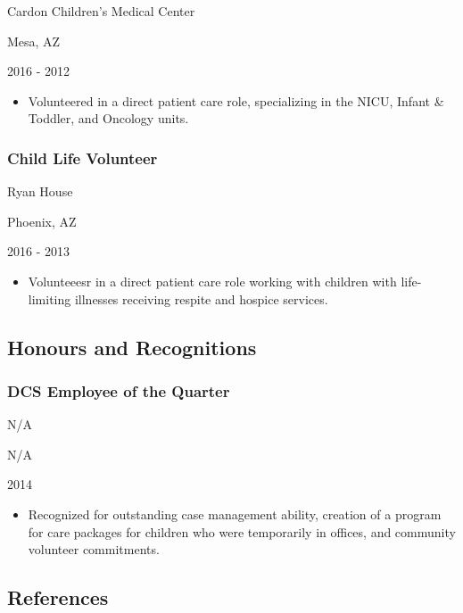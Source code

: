 \documentclass[
]{article}
\providecommand{\tightlist}{%
  \setlength{\itemsep}{0pt}\setlength{\parskip}{0pt}}
\begin{document}
Cardon Children's Medical Center

Mesa, AZ

2016 - 2012

\begin{itemize}
\tightlist
\item
  Volunteered in a direct patient care role, specializing in the NICU,
  Infant \& Toddler, and Oncology units.
\end{itemize}

\hypertarget{child-life-volunteer}{%
\subsubsection{Child Life Volunteer}\label{child-life-volunteer}}

Ryan House

Phoenix, AZ

2016 - 2013

\begin{itemize}
\tightlist
\item
  Volunteeesr in a direct patient care role working with children with
  life-limiting illnesses receiving respite and hospice services.
\end{itemize}

\hypertarget{honours-and-recognitions}{%
\subsection{Honours and Recognitions}\label{honours-and-recognitions}}

\hypertarget{dcs-employee-of-the-quarter}{%
\subsubsection{DCS Employee of the
Quarter}\label{dcs-employee-of-the-quarter}}

N/A

N/A

2014

\begin{itemize}
\tightlist
\item
  Recognized for outstanding case management ability, creation of a
  program for care packages for children who were temporarily in
  offices, and community volunteer commitments.
\end{itemize}

\hypertarget{references}{%
\subsection{References}\label{references}}
\end{document}
